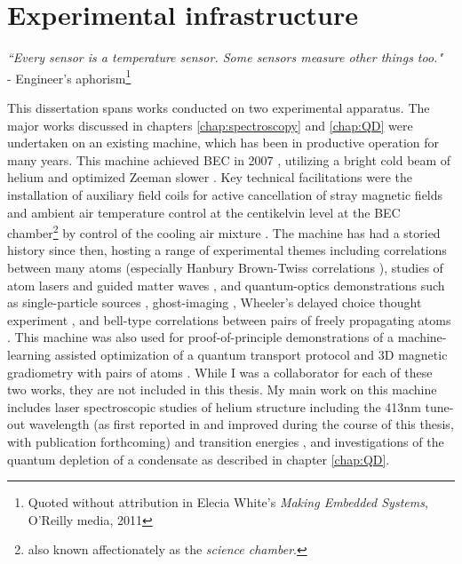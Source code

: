 
\chapter{Experimental infrastructure}
	\begin{adjustwidth}{0cm}{0cm}
	\begin{flushright}
	\emph{``Every sensor is a temperature sensor.
	 Some sensors measure other things too."\\} 
	- Engineer's aphorism\footnote{Quoted without attribution in Elecia White's \emph{Making Embedded Systems}, O'Reilly media, 2011}
	\end{flushright}
	\end{adjustwidth}

	This dissertation spans works conducted on two experimental apparatus.
	The major works discussed in chapters \ref{chap:spectroscopy} and \ref{chap:QD} were undertaken on an existing machine, which has been in productive operation for many years.
	This machine achieved BEC in 2007 \cite{dall07}, utilizing a bright cold beam of helium \cite{swansson04} and optimized Zeeman slower \cite{dedman04}.
	Key technical facilitations were the installation of auxiliary field coils for active cancellation of stray magnetic fields \cite{dedman04} and ambient air temperature control at the centikelvin level at the BEC chamber\footnote{also known affectionately as the \emph{science chamber}.} by control of the cooling air mixture \cite{dedman15}.
	The machine has had a storied history since then, hosting a range of experimental themes including correlations between many atoms \cite{hodgman17,dall13,manning13} (especially Hanbury Brown-Twiss correlations \cite{manning10,dall11a,hodgman11,rugway11,rugway13}), studies of atom lasers \cite{dall07,dall08a,henson18,manning10} and guided matter waves \cite{dall10, dall11a,dall11}, and quantum-optics demonstrations such as single-particle sources \cite{manning14}, ghost-imaging \cite{khakimov16,hodgman19}, Wheeler's delayed choice thought experiment \cite{manning15}, and bell-type correlations between pairs of freely propagating atoms \cite{shin19}.
	This machine was also used for proof-of-principle demonstrations of a machine-learning assisted optimization of a quantum transport protocol \cite{henson18ML} and 3D magnetic gradiometry with pairs of atoms \cite{shin20}.
	While I was a collaborator for each of these two works, they are not included in this thesis.
	My main work on this machine includes laser spectroscopic studies of helium structure including the 413nm tune-out wavelength (as first reported in \cite{henson15} and improved during the course of this thesis, with publication forthcoming) and transition energies \cite{ross20,thomas20}, and  investigations of the quantum depletion of a condensate as described in chapter \ref{chap:QD}.
	
